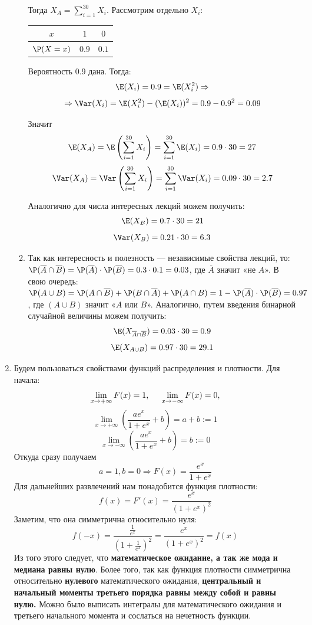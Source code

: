 \begin{enumerate}
\begin{enumerate}
Тогда $X_A = \sum\limits_{i=1}^{30}X_i$. Рассмотрим отдельно $X_i$:

\begin{tabular}{@{}ccc@{}}
\toprule
$x$         & $1$             & $0$               \\ \midrule
$\P(X=x)$ & $0.9$ & $0.1$ \\ \bottomrule
\end{tabular}

Вероятность 0.9 дана. Тогда:
\[
\E(X_i) = 0.9 = \E(X^2_i) \Rightarrow
\]
\[
\Rightarrow \Var(X_i) = \E(X^2_i) - (\E(X_i))^2 = 0.9 - 0.9^2 = 0.09
\]

Значит
\[
\E(X_A) = \E\left(\sum\limits_{i=1}^{30}X_i\right) = \sum\limits_{i=1}^{30}\E(X_i)  = 0.9\cdot30 = 27
\]
\[
\Var(X_A) = \Var\left(\sum\limits_{i=1}^{30}X_i\right) = \sum\limits_{i=1}^{30}\Var(X_i) = 0.09\cdot30 = 2.7
\]

Аналогично для числа интересных лекций можем получить:
\[
\E(X_B) = 0.7\cdot 30 = 21
\]
\[
\Var(X_B) = 0.21\cdot 30 = 6.3
\]


\item Так как интересность и полезность — независимые свойства лекций, то:\\
 $\P(\overline{A} \cap \overline{B}) = \P(\overline{A})\cdot \P(\overline{B}) = 0.3\cdot0.1 = 0.03$, где $\overline{A}$ значит «не $A$». В свою очередь:\\
 $\P(A\cup B) = \P(A\cap\overline{B}) + \P(B\cap\overline{A}) + \P(A\cap B) = 1 - \P(\overline{A})\cdot \P(\overline{B}) = 0.97$ , где $(A\cup B)$ значит «$A$  или $B$». Аналогично, путем введения бинарной случайной величины можем получить:
 \[
 \E(X_{\overline{A} \cap \overline{B}}) = 0.03 \cdot  30 = 0.9
 \]
 \[
 \E(X_{A\cup B}) = 0.97\cdot30 = 29.1
\]
\end{enumerate}

\item
Будем пользоваться свойствами функций распределения и плотности. Для начала:
\[
\lim\limits_{x \rightarrow +\infty} F(x) = 1, \hspace{0.5cm} \lim\limits_{x \rightarrow -\infty} F(x) = 0,
\]
\[
\lim\limits_{x \rightarrow +\infty} \left(\frac{ae^x}{1+e^x}+b\right) = a+b := 1
\]
\[
\lim\limits_{x \rightarrow -\infty} \left(\frac{ae^x}{1+e^x}+b\right) = b :=0
\]
Откуда сразу получаем \[a =1, b = 0 \Rightarrow F(x) = \frac{e^x}{1+e^x}\]
Для дальнейших развлечений нам понадобится функция плотности:
\[
f(x) = F'(x) = \frac{e^x}{(1+e^x)^2}
\]
 Заметим, что она симметрична относительно нуля:
 \[
 f(-x) = \frac{\frac{1}{e^x}}{\left(1+\frac{1}{e^x}\right)^2} = \frac{e^x}{(1+e^x)^2} = f(x)
 \]
 Из того этого следует, что \textbf{математическое ожидание, а так же мода и медиана равны нулю}. Более того, так как функция плотности симметрична относительно \textbf{нулевого} математического ожидания, \textbf{центральный и начальный моменты третьего порядка равны между собой и равны нулю.} Можно было выписать интегралы для математического ожидания и третьего начального момента и сослаться на нечетность функции.


\end{enumerate}

